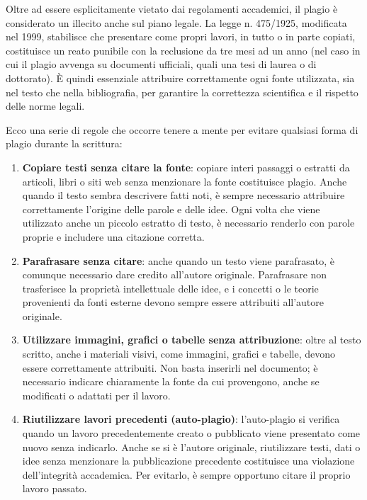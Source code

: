 \documentclass[9pt,a4paper,twoside]{rho-class/rho}
\begin{document}
Oltre ad essere esplicitamente vietato dai regolamenti accademici, il plagio è considerato un illecito anche sul piano legale. La legge n. 475/1925, modificata nel 1999, stabilisce che presentare come propri lavori, in tutto o in parte copiati, costituisce un reato punibile con la reclusione da tre mesi ad un anno (nel caso in cui il plagio avvenga su documenti ufficiali, quali una tesi di laurea o di dottorato). È quindi essenziale attribuire correttamente ogni fonte utilizzata, sia nel testo che nella bibliografia, per garantire la correttezza scientifica e il rispetto delle norme legali.

Ecco una serie di regole che occorre tenere a mente per evitare qualsiasi forma di plagio durante la scrittura:
\begin{enumerate}
\item \textbf{Copiare testi senza citare la fonte}: copiare interi passaggi o estratti da articoli, libri o siti web senza menzionare la fonte costituisce plagio. Anche quando il testo sembra descrivere fatti noti, è sempre necessario attribuire correttamente l’origine delle parole e delle idee. Ogni volta che viene utilizzato anche un piccolo estratto di testo, è necessario renderlo con parole proprie e includere una citazione corretta.

\item \textbf{Parafrasare senza citare}: anche quando un testo viene parafrasato, è comunque necessario dare credito all’autore originale. Parafrasare non trasferisce la proprietà intellettuale delle idee, e i concetti o le teorie provenienti da fonti esterne devono sempre essere attribuiti all’autore originale.

\item \textbf{Utilizzare immagini, grafici o tabelle senza attribuzione}: oltre al testo scritto, anche i materiali visivi, come immagini, grafici e tabelle, devono essere correttamente attribuiti. Non basta inserirli nel documento; è necessario indicare chiaramente la fonte da cui provengono, anche se modificati o adattati per il lavoro.

\item \textbf{Riutilizzare lavori precedenti (auto-plagio)}: l’auto-plagio si verifica quando un lavoro precedentemente creato o pubblicato viene presentato come nuovo senza indicarlo. Anche se si è l’autore originale, riutilizzare testi, dati o idee senza menzionare la pubblicazione precedente costituisce una violazione dell’integrità accademica. Per evitarlo, è sempre opportuno citare il proprio lavoro passato.


\end{enumerate}
\end{document}
